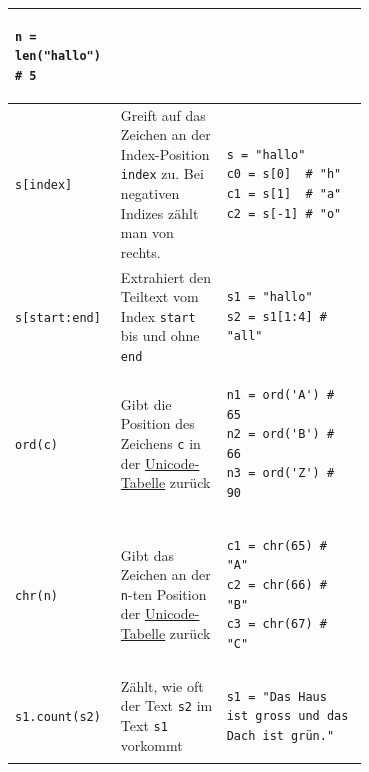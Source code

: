 \begin{table}[H]
\begin{tabular}{l|p{0.3\linewidth}|p{0.4\linewidth}}
\begin{minipage}{\linewidth}
\begin{lstlisting}[numbers=none]
n = len("hallo") # 5
\end{lstlisting}
\end{minipage} \\\midrule\midrule
\lstinline|s[index]| & Greift auf das Zeichen an der Index-Position \lstinline|index| zu. Bei negativen Indizes zählt man von rechts. & \begin{minipage}{\linewidth}
\begin{lstlisting}[numbers=none]
s = "hallo"
c0 = s[0]  # "h"
c1 = s[1]  # "a"
c2 = s[-1] # "o"
\end{lstlisting}
\end{minipage}
 \\\midrule
\lstinline|s[start:end]| & Extrahiert den Teiltext vom Index \lstinline|start| bis und ohne \lstinline|end| & \begin{minipage}{\linewidth}
\begin{lstlisting}[numbers=none]
s1 = "hallo"
s2 = s1[1:4] # "all"
\end{lstlisting}
\end{minipage}\\\midrule\midrule
\lstinline|ord(c)| & Gibt die Position des Zeichens \lstinline|c| in der \href{https://en.wikipedia.org/wiki/List_of_Unicode_characters}{Unicode-Tabelle} zurück & \begin{minipage}{\linewidth}
\begin{lstlisting}[numbers=none]
n1 = ord('A') # 65
n2 = ord('B') # 66
n3 = ord('Z') # 90
\end{lstlisting}
\end{minipage}\\\midrule
\lstinline|chr(n)| & Gibt das Zeichen an der \lstinline|n|-ten Position der \href{https://en.wikipedia.org/wiki/List_of_Unicode_characters}{Unicode-Tabelle} zurück & \begin{minipage}{\linewidth}
\begin{lstlisting}[numbers=none]
c1 = chr(65) # "A"
c2 = chr(66) # "B"
c3 = chr(67) # "C"
\end{lstlisting}\end{minipage}\\\midrule\midrule
\lstinline|s1.count(s2)| & Zählt, wie oft der Text \lstinline|s2| im Text \lstinline|s1| vorkommt & \begin{minipage}{\linewidth}
\begin{lstlisting}[numbers=none]
s1 = "Das Haus ist gross und das Dach ist grün."

\end{lstlisting}
\end{minipage}
\end{tabular}
\end{table}
